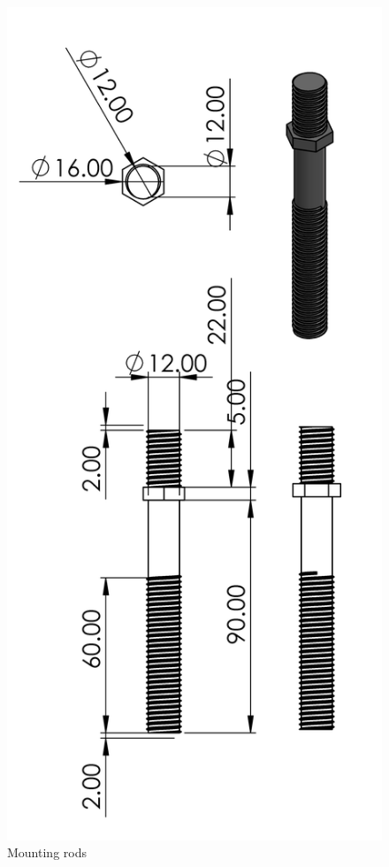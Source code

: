 \begin{enumerate}
\begin{enumerate}
\begin{figure}[H]
          \includegraphics[height=.55\textheight]{Figures/ServoMotorMountRods.PNG}
          \caption{Mounting rods}
          \label{fig:mounting_rods}
      \end{figure}
      \par

\end{enumerate}
\end{enumerate}
